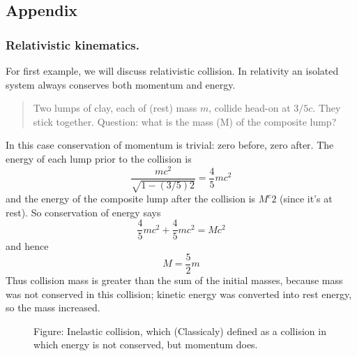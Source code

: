 \documentclass[../../main.tex]{subfiles}
\begin{document}
\subsection{Appendix}
\subsubsection{Relativistic kinematics.} For first example, we will discuss relativistic collision. In relativity an isolated system always conserves both momentum and energy. 
\begin{quote}
    Two lumps of clay, each of (rest) mass $m$, collide head-on at $3/5 c$. They stick together. Question: what is the mass (M) of the composite lump?
\end{quote}
In this case conservation of momentum is trivial: zero before, zero after. The energy of each lump prior to the collision is
\begin{equation*}
    \frac{mc^2}{\sqrt{1 - (3/5)2}}=\frac{4}{5}mc^2
\end{equation*}
and the energy of the composite lump after the collision is $M^c2$ (since it's at rest). So conservation of energy says
\begin{equation*}
    \frac{4}{5}mc^2+\frac{4}{5}mc^2=Mc^2
\end{equation*}
and hence
\begin{equation*}
    M=\frac{5}{2}m
\end{equation*}
Thus collision mass is greater than the sum of the initial masses, because mass was not conserved in this collision; kinetic energy was converted into rest energy, so the mass increased.
\begin{figure}[b]
    \centering
    \caption*{Figure: Inelastic collision, which (Classicaly) defined as a collision in which energy is not conserved, but momentum does.}
\end{figure}
\end{document}
